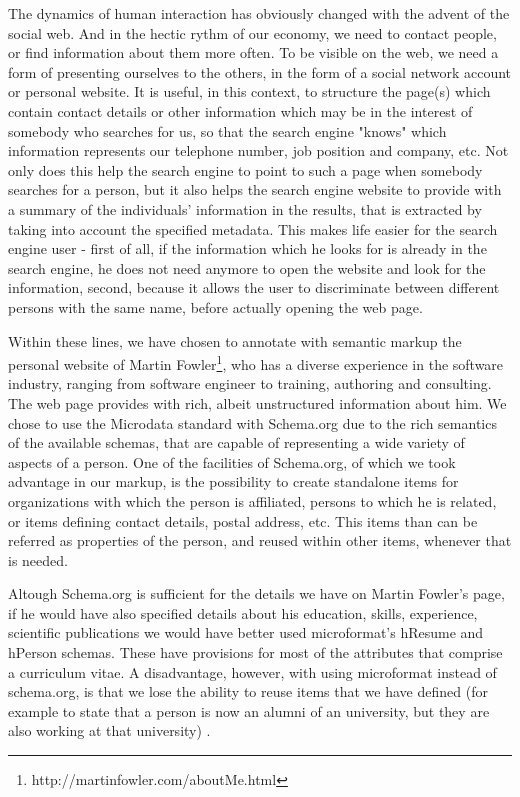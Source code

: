 \documentclass{acm_proc_10ptArticle-sp}
\begin{document}
The dynamics of human interaction has obviously changed with the advent of the social web. And in the hectic rythm of our economy, we need to contact people, or find information about them more often. To be visible on the web, we need a form of presenting ourselves to the others, in the form of a social network account or personal website. It is useful, in this context, to structure the page(s) which contain contact details or other information which may be in the interest of somebody who searches for us, so that the search engine "knows" which information represents our telephone number, job position and company, etc. Not only does this help the search engine to point to such a page when somebody searches for a person, but it also helps the search engine website to provide with a summary of the individuals' information in the results, that is extracted by taking into account the specified metadata. This makes life easier for the search engine user - first of all, if the information which he looks for is already in the search engine, he does not need anymore to open the website and look for the information, second, because it allows the user to discriminate between different persons with the same name, before actually opening the web page. 

Within these lines, we have chosen to annotate with semantic markup the personal website of Martin Fowler\footnote{http://martinfowler.com/aboutMe.html}, who has a diverse experience in the software industry, ranging from software engineer to training, authoring and consulting.  The web page provides with rich, albeit unstructured information about him. We chose to use the Microdata standard with Schema.org due to the rich semantics of the available schemas, that are capable of representing a wide variety of aspects of a person. One of the facilities of Schema.org, of which we took advantage in our markup, is the possibility to create standalone items for organizations with which the person is affiliated, persons to which he is related, or items defining contact details, postal address, etc. This items than can be referred as properties of the person, and reused within other items, whenever that is needed. 

Altough Schema.org is sufficient for the details we have on Martin Fowler's page, if he would have also specified details about his education, skills, experience, scientific publications we would have better used microformat's hResume and hPerson schemas. These have provisions for most of the attributes that comprise a curriculum vitae. A disadvantage, however, with using microformat instead of schema.org, is that we lose the ability to reuse items that we have defined (for example to state that a person is now an alumni of an university, but they are also working at that university) .
\end{document}
